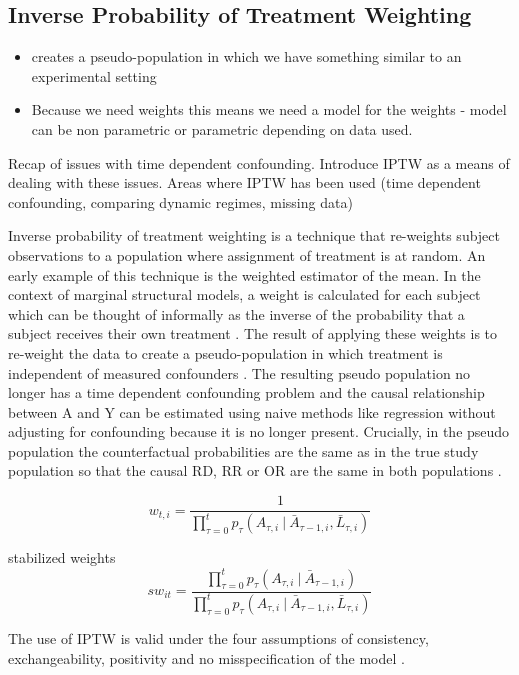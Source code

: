 \documentclass[11pt]{article}
\providecommand{\tightlist}{%
      \setlength{\itemsep}{0pt}\setlength{\parskip}{0pt}}
\begin{document}
    \subsection{Inverse Probability of Treatment
Weighting}\label{inverse-probability-of-treatment-weighting}

\begin{itemize}
\tightlist
\item
  creates a pseudo-population in which we have something similar to an
  experimental setting
\item
  Because we need weights this means we need a model for the weights -
  model can be non parametric or parametric depending on data used.
\end{itemize}

Recap of issues with time dependent confounding. Introduce IPTW as a
means of dealing with these issues. Areas where IPTW has been used (time
dependent confounding, comparing dynamic regimes, missing data)

Inverse probability of treatment weighting is a technique that
re-weights subject observations to a population where assignment of
treatment is at random. An early example of this technique is the
\citet{Horovitz1952} weighted estimator of the mean. In the context of
marginal structural models, a weight is calculated for each subject
which can be thought of informally as the inverse of the probability
that a subject receives their own treatment \citet{Robins2000}. The
result of applying these weights is to re-weight the data to create a
pseudo-population in which treatment is independent of measured
confounders \citet{Cole2008}. The resulting pseudo population no longer
has a time dependent confounding problem and the causal relationship
between A and Y can be estimated using naive methods like regression
without adjusting for confounding because it is no longer present.
Crucially, in the pseudo population the counterfactual probabilities are
the same as in the true study population so that the causal RD, RR or OR
are the same in both populations \citet{Robins2000}.

\[w_{t,i} = \frac{1}{\prod_{\tau=0} ^ t p_{\tau} (A_{\tau, i}\ |\ \bar A_{\tau-1, i}, \bar L_{\tau, i})}\]

stabilized weights
\[sw_{it} = \frac{\prod_{\tau=0} ^ t p_{\tau} (A_{\tau, i}\ |\ \bar A_{\tau-1, i})} {\prod_{\tau=0} ^ t p_{\tau} (A_{\tau, i}\ |\ \bar A_{\tau-1, i}, \bar L_{\tau, i})}\]

The use of IPTW is valid under the four assumptions of consistency,
exchangeability, positivity and no misspecification of the model
\citet{Cole2008}.
\end{document}

